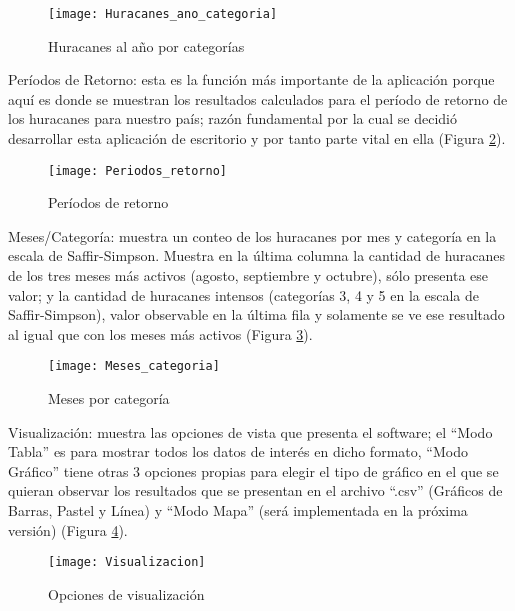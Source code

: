 \begin{figure}[H]
\centering
\texttt{[image: Huracanes\_ano\_categoria]}
\caption{Huracanes al año por categorías}
\label{fig:Huracanes_ano_categoria}
\end{figure}


Períodos de Retorno: esta es la función más importante de la aplicación porque aquí es donde se muestran los resultados calculados para el período de retorno de los huracanes para nuestro país; razón fundamental por la cual se decidió desarrollar esta aplicación de escritorio y por tanto parte vital en ella (Figura \ref{fig:Periodos_retorno}).

\begin{figure}[H]
\centering
\texttt{[image: Periodos\_retorno]}
\caption{Períodos de retorno}
\label{fig:Periodos_retorno}
\end{figure}

\pagebreak

Meses/Categoría: muestra un conteo de los huracanes por mes y categoría en la escala de Saffir-Simpson. Muestra en la última columna la cantidad de huracanes de los tres meses más activos (agosto, septiembre y octubre), sólo presenta ese valor; y la cantidad de huracanes intensos (categorías 3, 4 y 5 en la escala de Saffir-Simpson), valor observable en la última fila y solamente se ve ese resultado al igual que con los meses más activos (Figura \ref{fig:Meses_categoria}).

\begin{figure}[H]
\centering
\texttt{[image: Meses\_categoria]}
\caption{Meses por categoría}
\label{fig:Meses_categoria}
\end{figure}

\pagebreak

Visualización: muestra las opciones de vista que presenta el software; el “Modo Tabla” es para mostrar todos los datos de interés en dicho formato, “Modo Gráfico” tiene otras 3 opciones propias para elegir el tipo de gráfico en el que se quieran observar los resultados que se presentan en el archivo “.csv” (Gráficos de Barras, Pastel y Línea) y “Modo Mapa” (será implementada en la próxima versión) (Figura \ref{fig:Visualizacion}). %

\begin{figure}[H]
\centering
\texttt{[image: Visualizacion]}
\caption{Opciones de visualización}
\label{fig:Visualizacion}
\end{figure}


